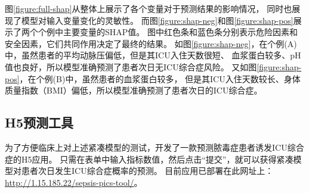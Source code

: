 图\ref{figure:full-shap}从整体上展示了各个变量对于预测结果的影响情况，%
同时也展现了模型对输入变量变化的灵敏性。%
而图\ref{figure:shap-neg}和图\ref{figure:shap-pos}展示了两个个例中主要变量的SHAP值。%
图中红色条和蓝色条分别表示危险因素和安全因素，它们共同作用决定了最终的结果。%
如图\ref{figure:shap-neg}，在个例(A)中，虽然患者的平均动脉压偏低，但是其ICU入住天数很短、%
血浆蛋白较多、pH值也良好，所以模型准确预测了患者次日无ICU综合症风险。%
又如图\ref{figure:shap-pos}，在个例(B)中，虽然患者的血浆蛋白较多，%
但是其ICU入住天数较长、身体质量指数（BMI）偏低，所以模型准确预测了患者次日的ICU综合症。

\subsection{H5预测工具}

\newcommand\PredictionToolURL{http://1.15.185.22/sepsis-pics-tool/}

为了方便临床上对上述紧凑模型的测试，开发了一款预测脓毒症患者诱发ICU综合症的H5应用。%
只需在表单中输入指标数值，然后点击“提交”，就可以获得紧凑模型对患者次日发生ICU综合症概率的预测。%
目前应用已部署在此网址上：\url{\PredictionToolURL}。
